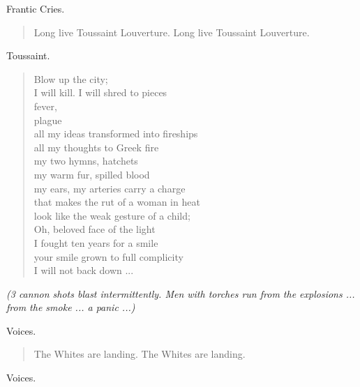 \documentclass[letterpaper,article,12pt,oneside,notitlepage]{memoir}
\begin{document}
\begin{center}Frantic Cries.\end{center}

\begin{verse}
\hspace{1cm} Long live Toussaint Louverture. Long live Toussaint Louverture. \\
\end{verse}

\begin{center}Toussaint.\end{center}

\begin{verse}
Blow up the city; \\
I will kill. I will shred to pieces \\
fever, \\
plague \\
all my ideas transformed into fireships \\
all my thoughts to Greek fire \\
my two hymns, hatchets \\
my warm fur, spilled blood \\
my ears, my arteries carry a charge \\
that makes the rut of a woman in heat \\
look like the weak gesture of a child; \\
Oh, beloved face of the light \\
I fought ten years for a smile \\
your smile grown to full complicity \\
I will not back down ... \\
\end{verse}

\textit{(3 cannon shots blast intermittently. Men with torches run from the explosions ... from the smoke ... a panic ...)}

\begin{center}Voices.\end{center}

\begin{verse}
\hspace{1cm} The Whites are landing. The Whites are landing. \\
\end{verse}

\begin{center}Voices.\end{center}
\end{document}
